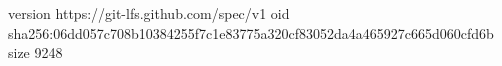 version https://git-lfs.github.com/spec/v1
oid sha256:06dd057c708b10384255f7c1e83775a320cf83052da4a465927c665d060cfd6b
size 9248
